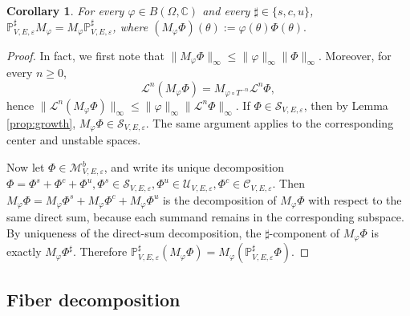 \documentclass[reqno,11pt]{amsart}
\newtheorem{corollary}{Corollary}[section]
\newcommand{\C}{{\mathbb C}}
\begin{document}
\begin{corollary}\label{commu}
    For every $\varphi\in B(\Omega,\C)$ and every $\sharp\in\{s,c,u\}$,
$
\mathbb{P}^\sharp_{V,E,\varepsilon}M_\varphi=M_\varphi \mathbb{P}^\sharp_{V,E,\varepsilon}
$, where 
$
(M_\varphi \Phi)(\theta):=\varphi(\theta)\Phi(\theta).
$
\end{corollary}
\begin{proof}
In fact, we first note that
$
\|M_\varphi \Phi\|_\infty\leq \|\varphi\|_\infty \|\Phi\|_\infty.
$
Moreover, for every $n\ge0$,
$$
\mathcal{ L }^{n}(M_\varphi\Phi)=M_{\varphi\circ T^{-n}} \mathcal{ L }^{n}\Phi,
$$
hence
$
\|\mathcal{ L }^{n}(M_\varphi\Phi)\|_\infty\leq
\|\varphi\|_\infty \|\mathcal{ L }^{n}\Phi\|_\infty.
$
If $\Phi\in\mathcal{S}_{V,E,\varepsilon}$, then by Lemma
\ref{prop:growth}, $M_\varphi\Phi\in \mathcal{S}_{V,E,\varepsilon}$. The same argument applies to the corresponding center and unstable spaces.

Now let $\Phi\in\mathcal{M}_{V,E,\varepsilon}^b$, and write its unique decomposition
$
\Phi=\Phi^s+\Phi^c+\Phi^u,
\Phi^s\in\mathcal{S}_{V,E,\varepsilon},\Phi^u\in  \mathcal{U}_{V,E,\varepsilon},\Phi^c\in \mathcal{C}_{V,E,\varepsilon}.$
Then
$
M_\varphi\Phi=M_\varphi\Phi^s+M_\varphi\Phi^c+M_\varphi\Phi^u
$
is the decomposition of $M_\varphi\Phi$ with respect to the same direct sum, because
each summand remains in the corresponding subspace. By uniqueness of the
direct-sum decomposition, the $\sharp$-component of $M_\varphi\Phi$ is exactly
$M_\varphi\Phi^\sharp$. Therefore
$
\mathbb{P}^\sharp_{V,E,\varepsilon}(M_\varphi\Phi)=M_\varphi(\mathbb{P}^\sharp_{V,E,\varepsilon}\Phi).
$
\end{proof}


\subsection{Fiber decomposition}
\end{document}
